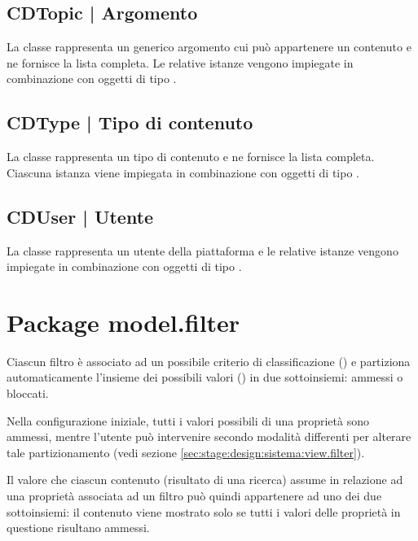 \documentclass[10pt,a4paper,headinclude,footinclude,hidelinks]{scrreprt} %
\begin{document}
	\subsection[CDTopic]{CDTopic | Argomento}
	\label{sec:stage:design:sistema:model.criteria:topic}
	La classe rappresenta un generico argomento cui può appartenere un contenuto e ne fornisce la lista completa. Le relative istanze vengono impiegate in combinazione con oggetti di tipo \textit{}.

	\subsection[CDType]{CDType | Tipo di contenuto}
	\label{sec:stage:design:sistema:model.criteria:type}
	La classe rappresenta un tipo di contenuto e ne fornisce la lista completa. Ciascuna istanza viene impiegata in combinazione con oggetti di tipo \textit{}.

	\subsection[CDUser]{CDUser | Utente}
	\label{sec:stage:design:sistema:model.criteria:user}
	La classe rappresenta un utente della piattaforma e le relative istanze vengono impiegate in combinazione con oggetti di tipo \textit{}.

	\section{Package model.filter}
	\label{sec:stage:design:sistema:model.filter}
	Ciascun filtro è associato ad un possibile criterio di classificazione (\textit{}) e partiziona automaticamente l'insieme dei possibili valori (\textit{}) in due sottoinsiemi: ammessi o bloccati.

	Nella configurazione iniziale, tutti i valori possibili di una proprietà sono ammessi, mentre l'utente può intervenire secondo modalità differenti per alterare tale partizionamento (vedi sezione \ref{sec:stage:design:sistema:view.filter}).
	
	Il valore che ciascun contenuto (risultato di una ricerca) assume in relazione ad una proprietà associata ad un filtro può quindi appartenere ad uno dei due sottoinsiemi: il contenuto viene mostrato solo se tutti i valori delle proprietà in questione risultano ammessi.
\end{document}
